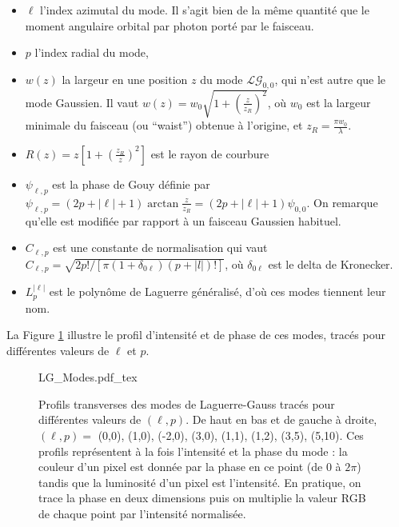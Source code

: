 \begin{itemize}
 \setlength\itemsep{1em}
\item $\ell$ l'index azimutal du mode. Il s'agit bien de la même quantité que le moment angulaire orbital par photon porté par le faisceau.
\item $p$ l'index radial du mode,
\item $w(z)$ la largeur en une position $z$ du mode ${\mathcal{LG}_{0,0}}$, qui n'est autre que le mode Gaussien. Il vaut $w(z)=w_0\sqrt{1+\left(\frac{z}{z_R}\right)^2}$, où $w_0$ est la largeur minimale du faisceau (ou ``waist'') obtenue à l'origine, et $z_R=\frac{\pi w_0}{\lambda}$.
\item $R(z)=z\left[1+\left(\frac{z_R}{z}\right)^2\right]$ est le rayon de courbure
\item $\psi _{\ell ,p}$ est la phase de Gouy définie par $\psi _{\ell ,p}=(2p+\left|\ell\right|+1)\arctan{\frac{z}{z_R}}=(2p+\left|\ell\right|+1)\psi _{0,0}$. On remarque qu'elle est modifiée par rapport à un faisceau Gaussien habituel.
\item $C_{\ell,p}$ est une constante de normalisation qui vaut $C_{\ell,p}=\sqrt{2p!/\left[\pi(1+\delta_{0\ell})(p+\left|l\right|)!\right]}$, où $\delta_{0\ell}$ est le delta de Kronecker.
\item $L_p^{\left| \ell  \right|}$ est le polynôme de Laguerre généralisé, d'où ces modes tiennent leur nom. 
\end{itemize}

La Figure \ref{Fig:LGModes} illustre le profil d'intensité et de phase de ces modes, tracés pour différentes valeurs de $\ell$ et $p$.
\begin{figure}[!ht]
\centering
\def\svgwidth{\columnwidth}
{LG_Modes.pdf_tex}
\caption{Profils transverses des modes de Laguerre-Gauss tracés pour différentes valeurs de $(\ell,p)$. De haut en bas et de gauche à droite, $(\ell,p) =$ (0,0), (1,0), (-2,0), (3,0), (1,1), (1,2), (3,5), (5,10). Ces profils représentent à la fois l'intensité et la phase du mode : la couleur d'un pixel est donnée par la phase en ce point (de 0 à $2\pi$) tandis que la luminosité d'un pixel est l'intensité. En pratique, on trace la phase en deux dimensions puis on multiplie la valeur RGB de chaque point par l'intensité normalisée.}
\label{Fig:LGModes}
\end{figure}

